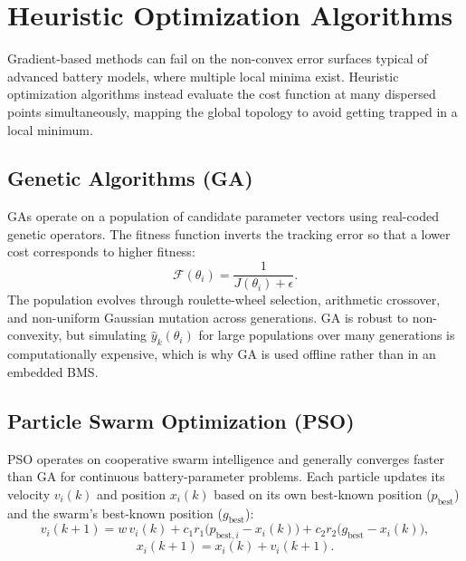 \section{Heuristic Optimization Algorithms}
\label{sec:heuristic_optimization}

Gradient-based methods can fail on the non-convex error surfaces typical of advanced battery models, where multiple local minima exist. Heuristic optimization algorithms instead evaluate the cost function at many dispersed points simultaneously, mapping the global topology to avoid getting trapped in a local minimum.

\subsection{Genetic Algorithms (GA)}
\label{subsec:genetic_algorithms}

GAs operate on a population of candidate parameter vectors using real-coded genetic operators. The fitness function inverts the tracking error so that a lower cost corresponds to higher fitness:
\begin{equation}
\label{eq:ga_fitness}
\mathcal{F}(\theta_i) = \frac{1}{J(\theta_i) + \epsilon}.
\end{equation}
The population evolves through roulette-wheel selection, arithmetic crossover, and non-uniform Gaussian mutation across generations. GA is robust to non-convexity, but simulating $\hat{y}_k(\theta_i)$ for large populations over many generations is computationally expensive, which is why GA is used offline rather than in an embedded BMS.

\subsection{Particle Swarm Optimization (PSO)}
\label{subsec:particle_swarm_optimization}

PSO operates on cooperative swarm intelligence and generally converges faster than GA for continuous battery-parameter problems. Each particle updates its velocity $v_i(k)$ and position $x_i(k)$ based on its own best-known position ($p_{\mathrm{best}}$) and the swarm's best-known position ($g_{\mathrm{best}}$):
\begin{equation}
\label{eq:pso_velocity}
v_i(k+1) = w\, v_i(k) + c_1 r_1 \big(p_{\mathrm{best},i} - x_i(k)\big) + c_2 r_2 \big(g_{\mathrm{best}} - x_i(k)\big),
\end{equation}
\begin{equation}
\label{eq:pso_position}
x_i(k+1) = x_i(k) + v_i(k+1).
\end{equation}

